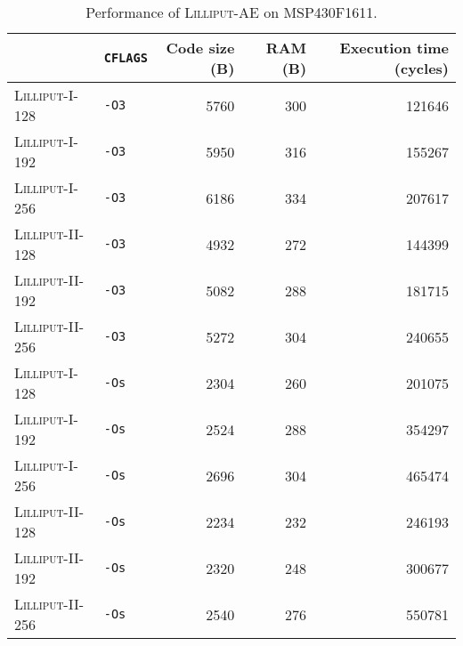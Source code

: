 \begin{table}[H]
  \centering
  \begin{tabular}{l|l||r|r|r}
      \textbf{}                & \textbf{\texttt{CFLAGS}} & \textbf{Code size (B)} & \textbf{RAM (B)} & \textbf{Execution time (cycles)} \\ \hline
      \textsc{Lilliput-I-128}  & \texttt{-O3}             &                   5760 &              300 &                           121646 \\ \hline
      \textsc{Lilliput-I-192}  & \texttt{-O3}             &                   5950 &              316 &                           155267 \\ \hline
      \textsc{Lilliput-I-256}  & \texttt{-O3}             &                   6186 &              334 &                           207617 \\ \hline
      \textsc{Lilliput-II-128} & \texttt{-O3}             &                   4932 &              272 &                           144399 \\ \hline
      \textsc{Lilliput-II-192} & \texttt{-O3}             &                   5082 &              288 &                           181715 \\ \hline
      \textsc{Lilliput-II-256} & \texttt{-O3}             &                   5272 &              304 &                           240655 \\ \hline
      \textsc{Lilliput-I-128}  & \texttt{-Os}             &                   2304 &              260 &                           201075 \\ \hline
      \textsc{Lilliput-I-192}  & \texttt{-Os}             &                   2524 &              288 &                           354297 \\ \hline
      \textsc{Lilliput-I-256}  & \texttt{-Os}             &                   2696 &              304 &                           465474 \\ \hline
      \textsc{Lilliput-II-128} & \texttt{-Os}             &                   2234 &              232 &                           246193 \\ \hline
      \textsc{Lilliput-II-192} & \texttt{-Os}             &                   2320 &              248 &                           300677 \\ \hline
      \textsc{Lilliput-II-256} & \texttt{-Os}             &                   2540 &              276 &                           550781 \\ \hline
  \end{tabular}
  \caption{Performance of \textsc{Lilliput-AE} on MSP430F1611.}
  \label{table:results/lilliput-msp}
\end{table}

